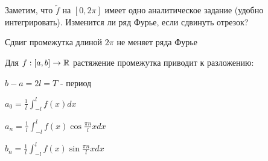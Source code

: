 \documentclass[12pt]{article}
\begin{document}
    \mediumvspace

    Заметим, что $\tilde{f}$ на $[0, 2\pi]$ имеет одно аналитическое задание (удобно интегрировать). Изменится ли 
    ряд Фурье, если сдвинуть отрезок?

    \begin{MyTheorem}
        \Ths Сдвиг промежутка длиной $2\pi$ не меняет ряда Фурье
    \end{MyTheorem}

    \begin{MyTheorem}
        \Ths Для $f : [a, b] \to \mathbb{R}$ растяжение промежутка приводит к разложению:

        $b - a = 2l = T$ - период

        $a_0 = \frac{1}{l} \int_{-l}^l f(x) dx$

        $a_n = \frac{1}{l} \int_{-l}^l f(x) \cos \frac{\pi n}{l} x dx$

        $b_n = \frac{1}{l} \int_{-l}^l f(x) \sin \frac{\pi n}{l} x dx$
    \end{MyTheorem}
\end{document}
